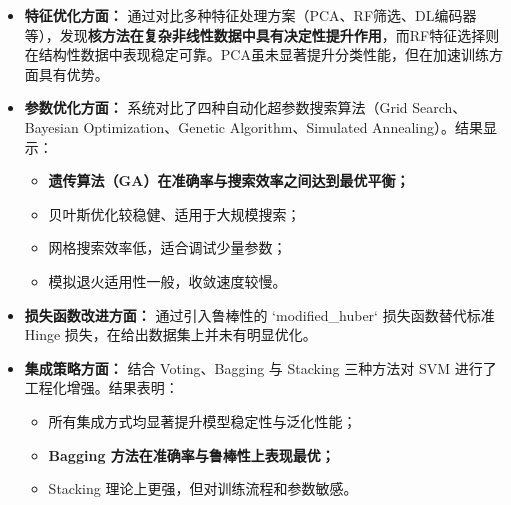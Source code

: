 \documentclass[twoside,dvipsnames]{CUGThesis}
\begin{document}
\begin{itemize}
    \item \textbf{特征优化方面：} 通过对比多种特征处理方案（PCA、RF筛选、DL编码器等），发现\textbf{核方法在复杂非线性数据中具有决定性提升作用}，而RF特征选择则在结构性数据中表现稳定可靠。PCA虽未显著提升分类性能，但在加速训练方面具有优势。
    \item \textbf{参数优化方面：} 系统对比了四种自动化超参数搜索算法（Grid Search、Bayesian Optimization、Genetic Algorithm、Simulated Annealing）。结果显示：
    \begin{itemize}
        \item \textbf{遗传算法（GA）在准确率与搜索效率之间达到最优平衡；}
        \item 贝叶斯优化较稳健、适用于大规模搜索；
        \item 网格搜索效率低，适合调试少量参数；
        \item 模拟退火适用性一般，收敛速度较慢。
    \end{itemize}
    \item \textbf{损失函数改进方面：} 通过引入鲁棒性的 `modified\_huber` 损失函数替代标准 Hinge 损失，在给出数据集上并未有明显优化。
    \item \textbf{集成策略方面：} 结合 Voting、Bagging 与 Stacking 三种方法对 SVM 进行了工程化增强。结果表明：
    \begin{itemize}
        \item 所有集成方式均显著提升模型稳定性与泛化性能；
        \item \textbf{Bagging 方法在准确率与鲁棒性上表现最优；}
        \item Stacking 理论上更强，但对训练流程和参数敏感。
    \end{itemize}
\end{itemize}
	
	
	
	
	\clearpage
	\nocite{*}
	
	
	
\end{document}

